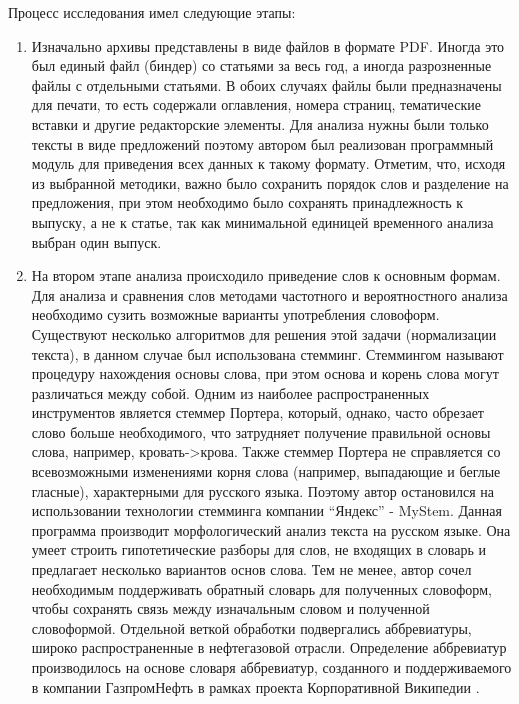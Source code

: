 Процесс исследования имел следующие этапы:

\begin{enumerate}
\item 
Изначально архивы представлены в виде файлов в формате PDF. 
Иногда это был единый файл (биндер) со статьями за весь год, а иногда разрозненные файлы с отдельными статьями. 
В обоих случаях файлы были предназначены для печати, то есть содержали оглавления, номера страниц, тематические вставки и другие редакторские элементы. 
Для анализа нужны были только тексты в виде предложений поэтому автором был реализован программный модуль для приведения всех данных к такому формату. 
Отметим, что, исходя из выбранной методики, важно было сохранить порядок слов и разделение на предложения, при этом необходимо было сохранять принадлежность к выпуску, а не к статье, так как минимальной единицей временного анализа выбран один выпуск.

\item 
На втором этапе анализа происходило приведение слов к основным формам. 
Для анализа и сравнения слов методами частотного и вероятностного анализа необходимо сузить возможные варианты употребления словоформ. 
Существуют несколько алгоритмов для решения этой задачи (нормализации текста), в данном случае был использована стемминг. 
Стеммингом называют процедуру нахождения основы слова, при этом основа и корень слова могут различаться между собой.  
Одним из наиболее распространенных инструментов является стеммер Портера, который, однако, часто обрезает слово больше необходимого, что затрудняет получение правильной основы слова, например, кровать->крова. 
Также стеммер Портера не справляется со всевозможными изменениями корня слова (например, выпадающие и беглые гласные), характерными для русского языка. 
Поэтому автор остановился на использовании технологии стемминга компании ``Яндекс'' - MyStem. 
Данная программа производит морфологический анализ текста на русском языке. 
Она умеет строить гипотетические разборы для слов, не входящих в словарь и предлагает несколько вариантов основ слова. 
Тем не менее, автор сочел необходимым поддерживать обратный словарь для полученных словоформ, чтобы сохранять связь между изначальным словом и полученной словоформой. Отдельной веткой обработки подвергались аббревиатуры, широко распространенные в нефтегазовой отрасли. 
Определение аббревиатур производилось на основе словаря аббревиатур, созданного и поддерживаемого в компании ГазпромНефть в рамках проекта Корпоративной Википедии \cite{khasanov2016corporate}.


\end{enumerate}

